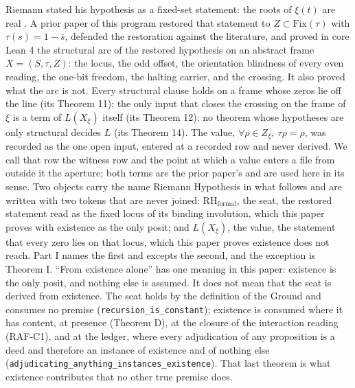 \documentclass[10pt,twocolumn]{article}
\begin{document}
Riemann stated his hypothesis as a fixed-set statement: the roots of
\(\xi(t)\) are real \cite{riemann1859}. A prior paper of this program
\cite{islamspine} restored that statement to
\(Z \subset \mathrm{Fix}(\tau)\) with \(\tau(s) = 1 - \bar{s}\),
defended the restoration against the literature, and proved in core Lean
4 the structural arc of the restored hypothesis on an abstract frame
\(X = (S, \tau, Z)\): the locus, the odd offset, the orientation
blindness of every even reading, the one-bit freedom, the halting
carrier, and the crossing. It also proved what the arc is not. Every
structural clause holds on a frame whose zeros lie off the line (its
Theorem 11); the only input that closes the crossing on the frame of
\(\xi\) is a term of \(L(X_\xi)\) itself (its Theorem 12); no theorem
whose hypotheses are only structural decides \(L\) (its Theorem 14). The
value, \(\forall \rho \in Z_\xi,\ \tau\rho = \rho\), was recorded as the
one open input, entered at a recorded row and never derived. We call
that row the witness row and the point at which a value enters a file
from outside it the aperture; both terms are the prior paper's and are
used here in its sense. Two objects carry the name Riemann Hypothesis in
what follows and are written with two tokens that are never joined:
\(\mathrm{RH}_{\mathrm{formal}}\), the seat, the restored statement read
as the fixed locus of its binding involution, which this paper proves
with existence as the only posit; and \(L(X_\xi)\), the value, the
statement that every zero lies on that locus, which this paper proves
existence does not reach. Part I names the first and excepts the second,
and the exception is Theorem I. ``From existence alone'' has one meaning
in this paper: existence is the only posit, and nothing else is assumed.
It does not mean that the seat is derived from existence. The seat holds
by the definition of the Ground and consumes no premise
(\texttt{recursion\_\allowbreak is\_\allowbreak constant}); existence is
consumed where it has content, at presence (Theorem D), at the closure
of the interaction reading (RAF-C1), and at the ledger, where every
adjudication of any proposition is a deed and therefore an instance of
existence and of nothing else
(\texttt{adjudicating\_\allowbreak anything\_\allowbreak instances\_\allowbreak existence}).
That last theorem is what existence contributes that no other true
premise does.
\end{document}
